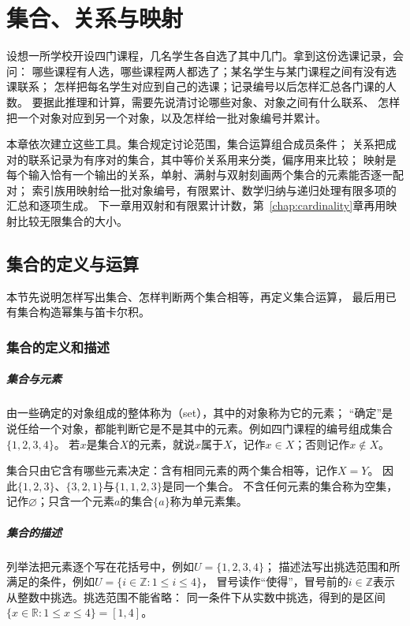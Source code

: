 \chapter{集合、关系与映射}
\label{chap:sets-functions-and-proofs}
\label{chap:sets-relations-maps}

设想一所学校开设四门课程，几名学生各自选了其中几门。拿到这份选课记录，会问：
哪些课程有人选，哪些课程两人都选了；某名学生与某门课程之间有没有选课联系；
怎样把每名学生对应到自己的选课；记录编号以后怎样汇总各门课的人数。
要据此推理和计算，需要先说清讨论哪些对象、对象之间有什么联系、
怎样把一个对象对应到另一个对象，以及怎样给一批对象编号并累计。

本章依次建立这些工具。集合规定讨论范围，集合运算组合成员条件；
关系把成对的联系记录为有序对的集合，其中等价关系用来分类，偏序用来比较；
映射是每个输入恰有一个输出的关系，单射、满射与双射刻画两个集合的元素能否逐一配对；
索引族用映射给一批对象编号，有限累计、数学归纳与递归处理有限多项的汇总和逐项生成。
下一章用双射和有限累计计数，第~\ref{chap:cardinality}章再用映射比较无限集合的大小。

\section{集合的定义与运算}
\label{sec:prelim-sets-relations-functions}

本节先说明怎样写出集合、怎样判断两个集合相等，再定义集合运算，
最后用已有集合构造幂集与笛卡尔积。

\subsection{集合的定义和描述}
\label{sec:prelim-set-definition}

\paragraph{集合与元素}
由一些确定的对象组成的整体称为（set），其中的对象称为它的元素；
“确定”是说任给一个对象，都能判断它是不是其中的元素。例如四门课程的编号组成集合$\{1,2,3,4\}$。
若$x$是集合$X$的元素，就说$x$属于$X$，记作$x\in X$；否则记作$x\notin X$。

集合只由它含有哪些元素决定：含有相同元素的两个集合相等，记作$X=Y$。
因此$\{1,2,3\}$、$\{3,2,1\}$与$\{1,1,2,3\}$是同一个集合。
不含任何元素的集合称为空集，记作$\varnothing$；只含一个元素$a$的集合$\{a\}$称为单元素集。

\paragraph{集合的描述}
列举法把元素逐个写在花括号中，例如$U=\{1,2,3,4\}$；
描述法写出挑选范围和所满足的条件，例如$U=\{i\in\mathbb Z:1\leq i\leq4\}$，
冒号读作“使得”，冒号前的$i\in\mathbb Z$表示从整数中挑选。挑选范围不能省略：
同一条件下从实数中挑选，得到的是区间$\{x\in\mathbb R:1\leq x\leq4\}=[1,4]$。

